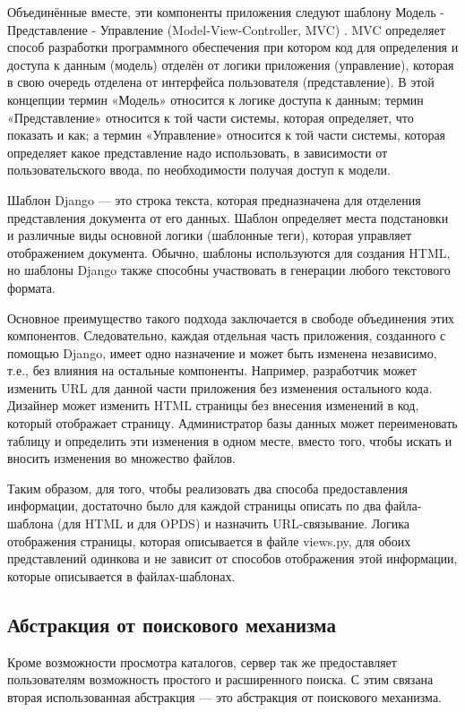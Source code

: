  Объединённые вместе, эти компоненты приложения следуют шаблону Модель - Представление - Управление  (Model-View-Controller, MVC) \cite{mvc}. MVC определяет способ разработки программного обеспечения при котором код для определения и доступа к данным (модель) отделён от логики приложения (управление), которая в свою очередь отделена от интерфейса пользователя (представление). В этой концепции термин «Модель» относится к логике доступа к данным; термин «Представление» относится к той части системы, которая определяет, что показать и как; а термин «Управление» относится к той части системы, которая определяет какое представление надо использовать, в зависимости от пользовательского ввода, по необходимости получая доступ к модели. 

Шаблон Django — это строка текста, которая предназначена для отделения представления документа от его данных. Шаблон определяет места подстановки и различные виды основной логики (шаблонные теги), которая управляет отображением документа. Обычно, шаблоны используются для создания HTML, но шаблоны Django также способны участвовать в генерации любого текстового формата.

Основное преимущество такого подхода заключается в свободе объединения этих компонентов. Следовательно, каждая отдельная часть приложения, созданного с помощью Django, имеет одно назначение и может быть изменена независимо, т.е., без влияния на остальные компоненты. Например, разработчик может изменить URL для данной части приложения без изменения остального кода. Дизайнер может изменить HTML страницы без внесения изменений в код, который отображает страницу. Администратор базы данных может переименовать таблицу и определить эти изменения в одном месте, вместо того, чтобы искать и вносить изменения во множество файлов.

Таким образом, для того, чтобы реализовать два способа предоставления информации, достаточно было для каждой страницы описать по два файла-шаблона (для HTML и для OPDS) и назначить URL-связывание. Логика отображения страницы, которая описывается в файле views.py, для обоих представлений одинкова и не зависит от способов отображения этой информации, которые описывается в файлах-шаблонах.

\subsection{Абстракция от поискового механизма}

Кроме возможности просмотра каталогов, сервер так же предоставляет пользователям возможность простого и расширенного поиска. С этим связана вторая использованная абстракция --- это абстракция от поискового механизма. 

